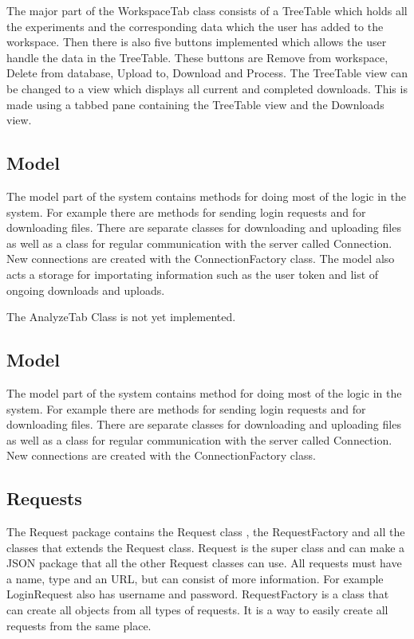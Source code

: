 The major part of the WorkspaceTab class consists of a TreeTable which holds all the experiments and the corresponding data which the user has added to the workspace. Then there is also five buttons implemented which allows the user handle the data in the TreeTable. These buttons are Remove from workspace, Delete from database, Upload to, Download and Process. The TreeTable view can be changed to a view which displays all current and completed downloads. This is made using a tabbed pane containing the TreeTable view and the Downloads view.

\subsection{Model}
The model part of the system contains methods for doing most of the logic in the system. For example there are methods for sending login requests and for downloading files. There are separate classes for downloading and uploading files as well as a class for regular communication with the server called Connection. New connections are created with the ConnectionFactory class. The model also acts a storage for importating information such as the user token and list of ongoing downloads and uploads.

The AnalyzeTab Class is not yet implemented.

\subsection{Model}
The model part of the system contains method for doing most of the logic in the system. For example there are methods for sending login requests and for downloading files. There are separate classes for downloading and uploading files as well as a class for regular communication with the server called Connection. New connections are created with the ConnectionFactory class.

\subsection{Requests}
The Request package contains the Request class , the RequestFactory and all the classes that extends the Request class. Request is the super class and can make a JSON package that all the other Request classes can use. All requests must have a name, type and an URL, but can consist of more information. For example LoginRequest also has username and password. RequestFactory is a class that can create all objects from all types of requests. It is a way to easily create all requests from the same place.


